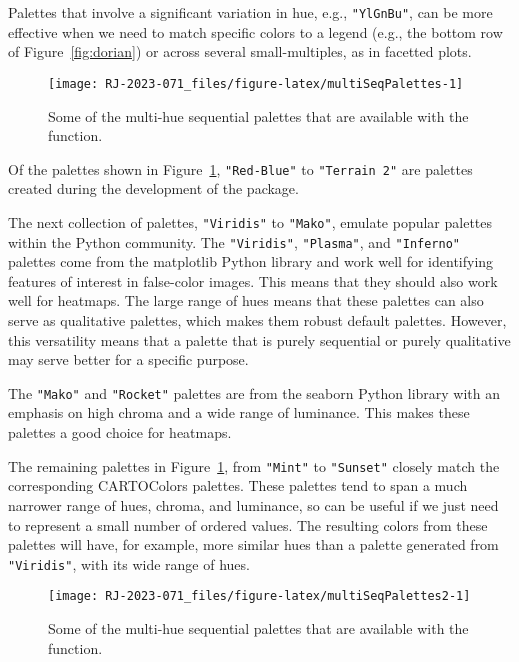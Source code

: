 Palettes that involve a
significant variation in hue, e.g., \texttt{"YlGnBu"}, can be more effective
when we need to match specific colors to a legend
(e.g., the bottom row of Figure~\ref{fig:dorian}) or across several
small-multiples, as in facetted plots.

\begin{figure}[ht!]

{\centering \texttt{[image: RJ-2023-071\_files/figure-latex/multiSeqPalettes-1]} 

}

\caption{Some of the multi-hue sequential palettes that are available with the  function.}\label{fig:multiSeqPalettes}
\end{figure}

Of the palettes shown in Figure~\ref{fig:multiSeqPalettes},
\texttt{"Red-Blue"} to \texttt{"Terrain\ 2"} are palettes created during the
development of the  package.

The next collection of palettes, \texttt{"Viridis"} to \texttt{"Mako"}, emulate
popular palettes within
the Python community.
The \texttt{"Viridis"}, \texttt{"Plasma"},
and \texttt{"Inferno"} palettes come from the matplotlib Python library
and work well for identifying features of interest in false-color images.
This means that they should also work well for heatmaps.
The large range of hues means that these palettes can also serve
as qualitative palettes, which makes them robust default palettes.
However, this versatility means that
a palette that is purely sequential or purely qualitative may serve better
for a specific purpose.

The \texttt{"Mako"} and \texttt{"Rocket"} palettes are from the seaborn Python
library with an emphasis on high chroma and a wide range of luminance.
This makes these palettes a good choice for heatmaps.

The remaining palettes in Figure~\ref{fig:multiSeqPalettes}, from
\texttt{"Mint"} to \texttt{"Sunset"} closely match the corresponding CARTOColors
palettes.
These palettes tend to span a much narrower range of hues, chroma,
and luminance, so can be useful if we just need to represent a
small number of ordered values.
The resulting colors from these palettes will have, for example,
more similar hues than a palette generated from \texttt{"Viridis"}, with
its wide range of hues.

\begin{figure}[ht!]

{\centering \texttt{[image: RJ-2023-071\_files/figure-latex/multiSeqPalettes2-1]} 

}

\caption{Some of the multi-hue sequential palettes that are available with the  function.}\label{fig:multiSeqPalettes2}
\end{figure}

